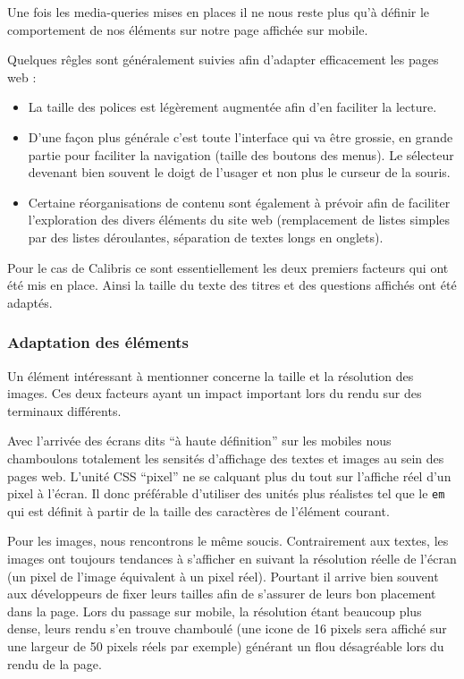 \documentclass[12pt,a4paper]{book}
\begin{document}
Une fois les media-queries mises en places il ne nous reste plus qu'à définir le comportement de nos éléments sur notre page affichée sur mobile.

Quelques rêgles sont généralement suivies afin d'adapter efficacement les pages web :
\begin{itemize}
  \item La taille des polices est légèrement augmentée afin d'en faciliter la lecture.
  \item D'une façon plus générale c'est toute l'interface qui va être grossie, en grande partie pour faciliter la navigation (taille des boutons des menus). Le sélecteur devenant bien souvent le doigt de l'usager et non plus le curseur de la souris.
  \item Certaine réorganisations de contenu sont également à prévoir afin de faciliter l'exploration des divers éléments du site web (remplacement de listes simples par des listes déroulantes, séparation de textes longs en onglets).
\end{itemize}

Pour le cas de Calibris ce sont essentiellement les deux premiers facteurs qui ont été mis en place. Ainsi la taille du texte des titres et des questions affichés ont été adaptés.

\subsubsection{Adaptation des éléments}

Un élément intéressant à mentionner concerne la taille et la résolution des images. Ces deux facteurs ayant un impact important lors du rendu sur des terminaux différents.

Avec l'arrivée des écrans dits ``à haute définition'' sur les mobiles nous chamboulons totalement les sensités d'affichage des textes et images au sein des pages web. L'unité CSS ``pixel'' ne se calquant plus du tout sur l'affiche réel d'un pixel à l'écran. Il donc préférable d'utiliser des unités plus réalistes tel que le \texttt{em} qui est définit à partir de la taille des caractères de l'élément courant.

Pour les images, nous rencontrons le même soucis. Contrairement aux textes, les images ont toujours tendances à s'afficher en suivant la résolution réelle de l'écran (un pixel de l'image équivalent à un pixel réel). Pourtant il arrive bien souvent aux développeurs de fixer leurs tailles afin de s'assurer de leurs bon placement dans la page. Lors du passage sur mobile, la résolution étant beaucoup plus dense, leurs rendu s'en trouve chamboulé (une icone de 16 pixels sera affiché sur une largeur de 50 pixels réels par exemple) générant un flou désagréable lors du rendu de la page.
\end{document}
